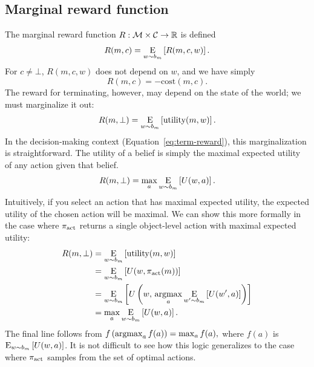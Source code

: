 \subsection{Marginal reward function}
The marginal reward function $R: \M \times \C \rightarrow \R$ is defined
%
\begin{equation}
R(m, c) = \expectunder{R(m, c, w)}{w \sim b_m}.
\end{equation}
%
For $c \neq \bot$, $R(m, c, w)$ does not depend on $w$, and we have simply
%
\begin{equation}
  R(m, c) = -\text{cost}(m, c).
\end{equation}
The reward for terminating, however, may depend on the state of the world; we must marginalize it out:
%
\begin{equation}\label{eq:marginal-term}
  R(m, \bot) = \expectunder{\utility(m, w)}{w \sim b_m}.
\end{equation}
%
In the decision-making context (Equation~\ref{eq:term-reward}), this marginalization is straightforward. The utility of a belief is simply the maximal expected utility of any action given that belief. 
%
\begin{equation}
  R(m, \bot) = \max_a \expectunder{U(w, a)}{w \sim b_m}.
\end{equation}
%
Intuitively, if you select an action that has maximal expected utility, the expected utility of the chosen action will be maximal. We can show this more formally in the case where $\pi\act$ returns a single object-level action with maximal expected utility:
\begin{equation}
\begin{aligned}
R(m, \bot)
&= \expectunder{\utility(m, w)}{w \sim b_m} \\
&= \expectunder{U(w, \pi\act(m))}{w \sim b_m} \\
&= \expectunder{U\left(w,\, \argmax_a \expectunder{U(w', a)}{w' \sim b_m}\right)}{w \sim b_m} \\
&= \max_a \expectunder{U(w, a)}{w \sim b_m}
.
\end{aligned}
\end{equation}
%
The final line follows from
%
\begin{math}
  f\left(\argmax_a f(a)\right) = \max_a f(a)
  ,
\end{math}
%
where $f(a)$ is $\expectunder{U(w, a)}{w \sim b_m}$. It is not difficult to see how this logic generalizes to the case where $\pi\act$ samples from the set of optimal actions.



